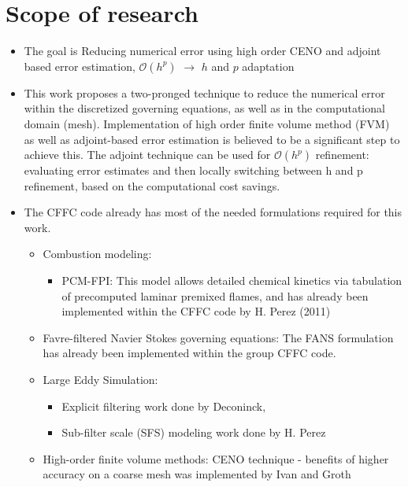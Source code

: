 \section{Scope of research}

\begin{itemize}

\item The goal is Reducing numerical error using high order CENO and adjoint based error estimation, $\mathcal{O}(h^p)$ $\rightarrow$ $h$ and $p$ adaptation

\item This work proposes a two-pronged technique to reduce the numerical error within the discretized governing equations, as well as in the computational domain (mesh).  Implementation of high order finite volume method (FVM) as well as adjoint-based error estimation is believed to be a significant step to achieve this. The adjoint technique can be used for $\mathcal{O}(h^p)$ refinement: evaluating error estimates and then locally switching between h and p refinement, based on the computational cost savings.

\item The CFFC code already has most of the needed formulations required for this work. 
\begin{itemize}
\item Combustion modeling:
  \begin{itemize}
   \item PCM-FPI: This model allows detailed chemical kinetics via tabulation of precomputed laminar premixed flames, and has already been implemented within the CFFC code by H. Perez (2011) ~\cite{hperez:2011a}
   \end{itemize}  

\item Favre-filtered Navier Stokes governing equations: The FANS formulation has already been implemented within the group CFFC code.
      
\item Large Eddy Simulation:
  \begin{itemize}
   \item Explicit filtering work done by Deconinck, ~\cite{Deconinck:2008}
   \item Sub-filter scale (SFS) modeling work done by H. Perez ~\cite{hperez:2011a}
  \end{itemize}

\item High-order finite volume methods: CENO technique - benefits of higher accuracy on a coarse mesh was implemented by Ivan and Groth ~\cite{ivan:2007, ivan:2013b}


\end{itemize}
\end{itemize}

